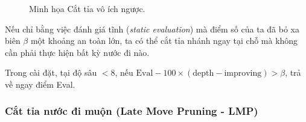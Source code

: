 \begin{figure}[htbp]
    \caption{Minh họa Cắt tỉa vô ích ngược.}
    \label{fig:reverse_futility_pruning}
\end{figure}
Nếu chỉ bằng việc đánh giá tĩnh (\textit{static evaluation}) mà điểm số của ta đã bỏ xa biên $\beta$ một khoảng an toàn lớn, ta có thể cắt tỉa nhánh ngay tại chỗ mà không cần phải thực hiện bất kỳ nước đi nào.

Trong cài đặt, tại độ sâu $< 8$, nếu $\text{Eval} - 100 \times (\text{depth} - \text{improving}) > \beta$, trả về ngay điểm Eval.

\subsubsection{Cắt tỉa nước đi muộn (Late Move Pruning - LMP)}


